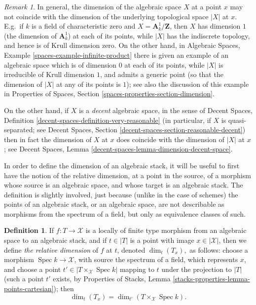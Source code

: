 \documentclass{stacks-project}
\theoremstyle{plain}
\theoremstyle{definition}
\newtheorem{definition}[subsection]{Definition}
\theoremstyle{remark}
\newtheorem{remark}[subsection]{Remark}
\numberwithin{equation}{subsection}
\def\Spec{\mathop{\mathrm{Spec}}}
\begin{document}
\begin{remark}
\label{remark-dimension-algebraic-space}
In general, the dimension of the algebraic space $X$ at a point $x$
may not coincide with the dimension of the underlying topological space
$|X|$ at $x$.  E.g.\ if $k$ is a field of characteristic zero and
$X =  \mathbf{A}^1_k / \mathbf{Z}$, then $X$ has dimension $1$ (the dimension
of $\mathbf{A}^1_k$) at each of its points,
while $|X|$ has the indiscrete topology, and hence is of Krull
dimension zero. On the other hand, in
Algebraic Spaces, Example \ref{spaces-example-infinite-product}
there is given an example of an algebraic space
which is of dimension $0$ at each of its points, while $|X|$ is
irreducible of Krull dimension $1$, and admits a generic point (so that the
dimension of $|X|$ at any of its points is $1$); see also the discussion
of this example in
Properties of Spaces, Section \ref{spaces-properties-section-dimension}.

\medskip\noindent
On the other hand, if $X$ is a {\it decent} algebraic space, in the sense of
Decent Spaces, Definition \ref{decent-spaces-definition-very-reasonable}
(in particular, if $X$ is quasi-separated; see
Decent Spaces, Section \ref{decent-spaces-section-reasonable-decent})
then in fact the dimension of $X$ at $x$ does coincide with the dimension
of $|X|$ at $x$; see
Decent Spaces, Lemma \ref{decent-spaces-lemma-dimension-decent-space}.
\end{remark}

\noindent
In order to  define the dimension of an algebraic stack,
it will be useful to first have the notion of the relative dimension,
at a point in the source,
of a morphism whose source is an algebraic space,
and whose target is an algebraic stack.  The definition is slightly
involved, just because (unlike in the case of schemes) the points of an
algebraic stack, or an algebraic
space, are not describable as morphisms from the spectrum of a field,
but only as equivalence classes of such.

\begin{definition}
\label{definition-relative-dimension}
If $f : T \to \mathcal{X}$ is a locally of finite type morphism from an
algebraic space to an algebraic stack,
and if $t \in |T|$ is a point with image $x \in | \mathcal{X}|$, then we define
{\it the relative dimension} of $f$ at $t$, denoted
$\dim_t(T_x),$
as follows:
choose a morphism $\Spec k \to \mathcal{X}$, with source the spectrum of
a field, which represents $x$, and choose a point
$t' \in |T \times_{\mathcal{X}} \Spec k|$
mapping to $t$ under the projection to $|T|$
(such a point $t'$ exists, by
Properties of Stacks, Lemma \ref{stacks-properties-lemma-points-cartesian});
then
$$
\dim_t(T_x) = \dim_{t'}(T \times_{\mathcal{X}} \Spec k ).
$$
\end{definition}
\end{document}
